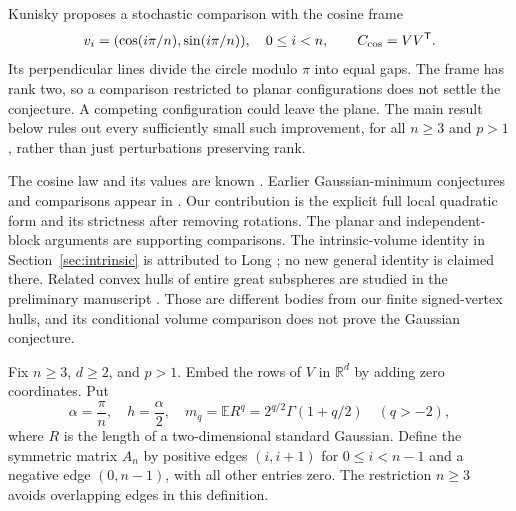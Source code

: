 \documentclass[11pt,a4paper]{article}
\theoremstyle{remark}\newtheorem{remark}[theorem]{Remark}
\newcommand{\E}{\mathbb E}
\newcommand{\R}{\mathbb R}
\begin{document}
Kunisky \cite{kunisky} proposes a stochastic comparison with the cosine frame
\[
 v_i=(\cos(i\pi/n),\sin(i\pi/n)),\quad 0\le i<n,
 \qquad C_{\rm cos}=VV^{\mathsf T}.
\]
Its perpendicular lines divide the circle modulo $\pi$ into equal gaps. The frame has rank two, so a comparison restricted to planar configurations does not settle the conjecture. A competing configuration could leave the plane. The main result below rules out every sufficiently small such improvement, for all $n\ge3$ and $p>1$, rather than just perturbations preserving rank.

The cosine law and its values are known \cite[Proposition 2.1 and Theorem 2.2]{kunisky}. Earlier Gaussian-minimum conjectures and comparisons appear in \cite{litvak,zhong}. Our contribution is the explicit full local quadratic form and its strictness after removing rotations. The planar and independent-block arguments are supporting comparisons. The intrinsic-volume identity in Section~\ref{sec:intrinsic} is attributed to Long \cite{long}; no new general identity is claimed there. Related convex hulls of entire great subspheres are studied in the preliminary manuscript \cite{cyclemath}. Those are different bodies from our finite signed-vertex hulls, and its conditional volume comparison does not prove the Gaussian conjecture.

Fix $n\ge3$, $d\ge2$, and $p>1$. Embed the rows of $V$ in $\R^d$ by adding zero coordinates. Put
\[
 \alpha=\frac{\pi}{n},\quad h=\frac{\alpha}{2},\quad
 m_q=\E R^q=2^{q/2}\Gamma(1+q/2)\quad(q>-2),
\]
where $R$ is the length of a two-dimensional standard Gaussian. Define the symmetric matrix $A_n$ by positive edges $(i,i+1)$ for $0\le i<n-1$ and a negative edge $(0,n-1)$, with all other entries zero. The restriction $n\ge3$ avoids overlapping edges in this definition.
\end{document}
